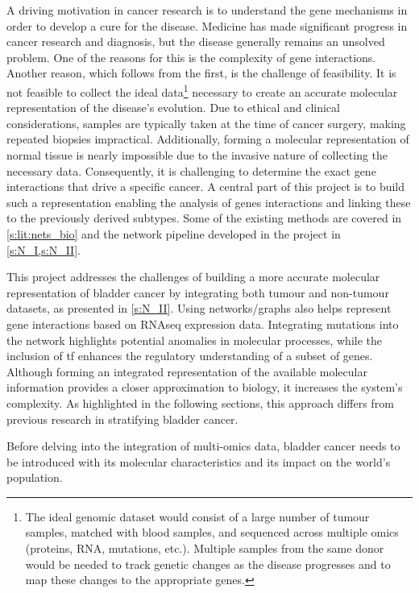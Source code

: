A driving motivation in cancer research is to understand the gene mechanisms in order to develop a cure for the disease. Medicine has made significant progress in cancer research and diagnosis, but the disease generally remains an unsolved problem. One of the reasons for this is the complexity of gene interactions. Another reason, which follows from the first, is the challenge of feasibility. It is not feasible to collect the ideal data\footnote{The ideal genomic dataset would consist of a large number of tumour samples, matched with blood samples, and sequenced across multiple omics (proteins, RNA, mutations, etc.). Multiple samples from the same donor would be needed to track genetic changes as the disease progresses and to map these changes to the appropriate genes.} necessary to create an accurate molecular representation of the disease's evolution. Due to ethical and clinical considerations, samples are typically taken at the time of cancer surgery, making repeated biopsies impractical. Additionally, forming a molecular representation of normal tissue is nearly impossible due to the invasive nature of collecting the necessary data. Consequently, it is challenging to determine the exact gene interactions that drive a specific cancer. A central part of this project is to build such a representation enabling the analysis of genes interactions and linking these to the previously derived subtypes. Some of the existing methods are covered in \cref{s:lit:nets_bio} and the network pipeline developed in the project in \cref{s:N_I,s:N_II}.

This project addresses the challenges of building a more accurate molecular representation of bladder cancer by integrating both tumour and non-tumour datasets, as presented in \cref{s:N_II}. Using networks/graphs also helps represent gene interactions based on RNAseq expression data. Integrating mutations into the network highlights potential anomalies in molecular processes, while the inclusion of \acrshort{tf} enhances the regulatory understanding of a subset of genes. Although forming an integrated representation of the available molecular information provides a closer approximation to biology, it increases the system's complexity. As highlighted in the following sections, this approach differs from previous research in stratifying bladder cancer.


Before delving into the integration of multi-omics data, bladder cancer needs to be introduced with its molecular characteristics and its impact on the world's population.


